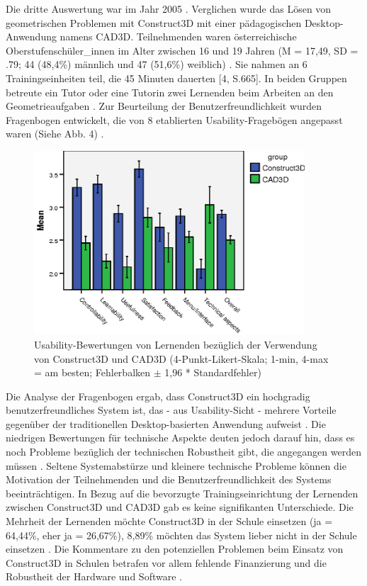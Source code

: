 \documentclass[deutsch]{llncs}
\begin{document}
 Die dritte Auswertung war im Jahr 2005 \cite{Kaufmann_summaryof}. Verglichen wurde das Lösen von geometrischen Problemen mit Construct3D mit einer pädagogischen Desktop-Anwendung namens CAD3D. Teilnehmenden waren österreichische Oberstufenschüler\_innen im Alter zwischen 16 und 19 Jahren (M = 17,49, SD = .79; 44 (48,4\%) männlich und 47 (51,6\%) weiblich) \cite{Kaufmann_summaryof}. Sie nahmen an 6 Trainingseinheiten teil, die 45 Minuten dauerten [4, S.665]. In beiden Gruppen betreute ein Tutor oder eine Tutorin zwei Lernenden beim Arbeiten an den Geometrieaufgaben  \cite{Kaufmann_summaryof}. Zur Beurteilung der Benutzerfreundlichkeit wurden Fragenbogen entwickelt, die von 8 etablierten Usability-Fragebögen angepasst waren (Siehe Abb. \label{stat1}4)  \cite{Kaufmann_summaryof}.
\begin{figure}[t]
	\centering
	\includegraphics[width=0.9\textwidth]{figures/stat1}
	\caption{Usability-Bewertungen von Lernenden bezüglich der Verwendung von Construct3D und CAD3D (4-Punkt-Likert-Skala; 1-min, 4-max = am besten; Fehlerbalken $\pm$ 1,96 * Standardfehler)\cite{Kaufmann_summaryof}}
	\label{fig:stat1}
\end{figure}
Die Analyse der Fragenbogen ergab, dass Construct3D ein hochgradig benutzerfreundliches System ist, das - aus Usability-Sicht - mehrere Vorteile gegenüber der traditionellen Desktop-basierten Anwendung aufweist \cite{Kaufmann_summaryof}. Die niedrigen Bewertungen für technische Aspekte deuten jedoch darauf hin, dass es noch Probleme bezüglich der technischen Robustheit gibt, die angegangen werden müssen \cite{Kaufmann_summaryof}. Seltene Systemabstürze und kleinere technische Probleme können die Motivation der Teilnehmenden und die Benutzerfreundlichkeit des Systems beeinträchtigen. In Bezug auf die bevorzugte Trainingseinrichtung der Lernenden zwischen Construct3D und CAD3D gab es keine signifikanten Unterschiede. Die Mehrheit der Lernenden möchte Construct3D in der Schule einsetzen (ja = 64,44\%, eher ja = 26,67\%), 8,89\% möchten das System lieber nicht in der Schule einsetzen \cite{Kaufmann_summaryof}.  Die Kommentare zu den potenziellen Problemen beim Einsatz von Construct3D in Schulen betrafen vor allem fehlende Finanzierung und die Robustheit der Hardware und Software \cite{Kaufmann_summaryof}.\\
\end{document}
